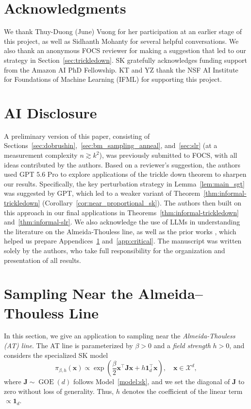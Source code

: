 \documentclass[11pt]{article}
\newcommand{\1}{\mathbf{1}}
\newcommand{\0}{\mathbf{0}}
\newcommand{\Par}[1]{\left(#1\right)}
\newcommand{\mj}{{\mathbf{J}}}
\newcommand{\vx}{{\mathbf{x}}}
\newcommand{\calX}{{\mathcal{X}}}
\begin{document}
\section*{Acknowledgments}
We thank Thuy-Duong (June) Vuong for her participation at an earlier stage of this project, as well as Sidhanth Mohanty for several helpful conversations. We also thank an anonymous FOCS reviewer for making a suggestion that led to our strategy in Section~\ref{sec:trickledown}. SK gratefully acknowledges funding support from the Amazon AI PhD Fellowship. KT and YZ thank the NSF AI Institute for Foundations of Machine Learning (IFML) for supporting this project.

\section*{AI Disclosure}
{}

A preliminary version of this paper, consisting of Sections~\ref{sec:dobrushin},~\ref{sec:bm_sampling_anneal}, and~\ref{sec:slr} (at a measurement complexity $n \gtrsim k^2$), was previously submitted to FOCS, with all ideas contributed by the authors. Based on a reviewer's suggestion, the authors used GPT 5.6 Pro to explore applications of the trickle down theorem to sharpen our results. Specifically, the key perturbation strategy in Lemma~\ref{lem:main_sgt} was suggested by GPT, which led to a weaker variant of Theorem~\ref{thm:informal-trickledown} (Corollary~\ref{cor:near_proportional_sk}). The authors then built on this approach in our final applications  in Theorems~\ref{thm:informal-trickledown} and~\ref{thm:informal-slr}. We also acknowledge the use of LLMs in understanding the literature on the Almeida-Thouless line, as well as the prior works \cite{Carlson2022, KuchukovaPappikPerkinsYap2025}, which helped us prepare Appendices~\ref{sec:sk_at_line} and~\ref{app:critical}. The manuscript was written solely by the authors, who take full responsibility for the organization and presentation of all results.




\newpage
\appendix

\section{Sampling Near the Almeida–Thouless Line}
\label{sec:sk_at_line}

In this section, we give an application to sampling near the \emph{Almeida-Thouless (AT) line}. The AT line is parameterized by  $\beta > 0$ and a \emph{field strength} $h > 0$, and considers the specialized SK model 
\begin{equation}
    \label{eq:sk_uniform_field}
    \pi_{\beta,h}(\vx)
    \propto
    \exp\Par{
        \frac{\beta}{2}\vx^\top\mj\vx
        +
        h\1_d^\top\vx
    },
    \quad
    \vx\in\calX^d,
\end{equation}
where $\mj\sim\operatorname{GOE}(d)$ follows
Model~\ref{model:sk}, and we set the diagonal of $\mj$ to zero without
loss of generality.
Thus, $h$ denotes the coefficient of the linear term $\propto \1_d$. 
\end{document}
